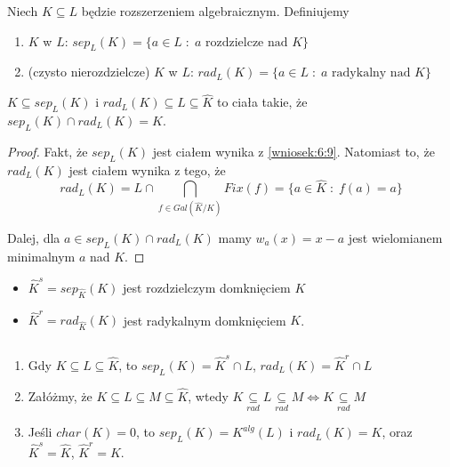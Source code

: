 \begin{bbox}
Niech $K\subseteq L$ będzie rozszerzeniem algebraicznym. Definiujemy
\begin{enumerate}
    \item {} $K$ w $L$: $sep_L(K)=\{a\in L\;:\;a\text{ rozdzielcze nad } K\}$
    \item {} (czysto nierozdzielcze) $K$ w $L$: $rad_L(K)=\{a\in L\;:\;a\text{ radykalny nad }K\}$
\end{enumerate}
\end{bbox}

\begin{conclusion}
$K\subseteq sep_L(K)$ i $rad_L(K)\subseteq L\subseteq \hat{K}$ to ciała takie, że $sep_L(K)\cap rad_L(K)=K$.
\end{conclusion}
\begin{proof}
Fakt, że $sep_L(K)$ jest ciałem wynika z \ref{wniosek:6:9}. Natomiast to, że $rad_L(K)$ jest ciałem wynika z tego, że
$$rad_L(K)=L\cap\bigcap\limits_{f\in Gal(\hat{K}/K)}Fix(f)=\{a\in\hat{K}\;:\;f(a)=a\}$$

Dalej, dla $a\in sep_L(K)\cap rad_L(K)$ mamy $w_a(x)=x-a$ jest wielomianem minimalnym $a$ nad $K$.
\end{proof}

\begin{bbox}
\begin{itemize}%
    \item[\PHrosette] $\hat{K}^s=sep_{\hat{K}}(K)$ jest rozdzielczym domknięciem $K$
    \item[\PHrosette] $\hat{K}^r=rad_{\hat{K}}(K)$ jest radykalnym domknięciem $K$.
\end{itemize}
\end{bbox}

\begin{remark}
$ $\newline
\begin{enumerate}
    \item Gdy $K\subseteq L\subseteq\hat{K}$, to $sep_L(K)=\hat{K}^s\cap L$, $rad_L(K)=\hat{K}^r\cap L$
    \item Załóżmy, że $K\subseteq L\subseteq M\subseteq\hat{K}$, wtedy $K\underset{rad}{\subseteq}L\underset{rad}{\subseteq}M\iff K\underset{rad}{\subseteq} M$
    \item Jeśli $char(K)=0$, to $sep_L(K)=K^{alg}(L)$ i $rad_L(K)=K$, oraz $\hat{K}^s=\hat{K}$, $\hat{K}^r=K$.
\end{enumerate}
\end{remark}

